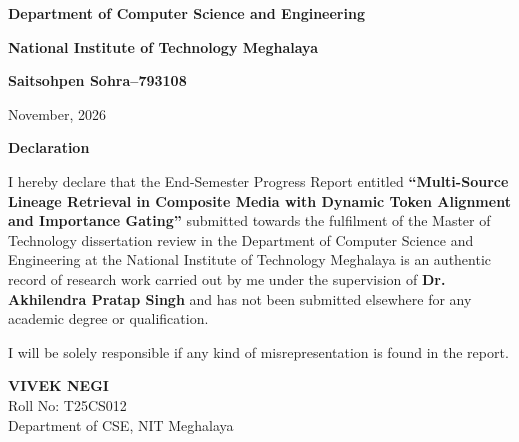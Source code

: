 \documentclass[12pt,a4paper]{article}
\begin{document}
\begin{center}
    \vfill
    
    {\normalsize \bfseries Department of Computer Science and Engineering\par}
    {\normalsize \bfseries National Institute of Technology Meghalaya\par}
    {\normalsize \bfseries Saitsohpen Sohra--793108\par}
    \vspace{0.4cm}
    {\normalsize November, 2026\par}
\end{center}

\newpage
{}
\setcounter{page}{1}

\begin{center}
    {\Large \bfseries Declaration\par}
\end{center}

\vspace{1.2cm}

\noindent I hereby declare that the End-Semester Progress Report entitled \textbf{``Multi-Source Lineage Retrieval in Composite Media with Dynamic Token Alignment and Importance Gating''} submitted towards the fulfilment of the Master of Technology dissertation review in the Department of Computer Science and Engineering at the National Institute of Technology Meghalaya is an authentic record of research work carried out by me under the supervision of \textbf{Dr. Akhilendra Pratap Singh} and has not been submitted elsewhere for any academic degree or qualification.

\vspace{1.0cm}

\noindent I will be solely responsible if any kind of misrepresentation is found in the report.

\vspace{2.5cm}

\begin{flushright}
    \textbf{VIVEK NEGI} \\
    Roll No: T25CS012 \\
    Department of CSE, NIT Meghalaya
\end{flushright}

\newpage
\tableofcontents
\newpage

\setcounter{page}{1}

\end{document}
